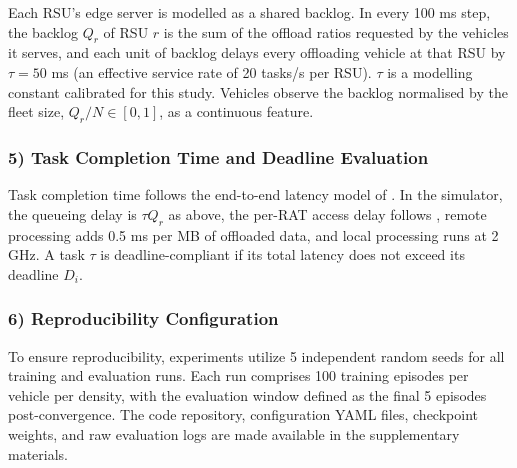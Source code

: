 Each RSU's edge server is modelled as a shared backlog. In every 100 ms step, the backlog $Q_r$ of RSU $r$ is the sum of the offload ratios requested by the vehicles it serves, and each unit of backlog delays every offloading vehicle at that RSU by $\tau = 50$ ms (an effective service rate of 20 tasks/s per RSU). $\tau$ is a modelling constant calibrated for this study. Vehicles observe the backlog normalised by the fleet size, $Q_r/N \in [0,1]$, as a continuous feature.

\subsubsection*{5) Task Completion Time and Deadline Evaluation}

Task completion time follows the end-to-end latency model of . In the simulator, the queueing delay is $\tau Q_r$ as above, the per-RAT access delay follows , remote processing adds 0.5 ms per MB of offloaded data, and local processing runs at 2 GHz. A task $\tau$ is deadline-compliant if its total latency does not exceed its deadline $D_i$.

\subsubsection*{6) Reproducibility Configuration}

To ensure reproducibility, experiments utilize 5 independent random seeds for all training and evaluation runs. Each run comprises 100 training episodes per vehicle per density, with the evaluation window defined as the final 5 episodes post-convergence. The code repository, configuration YAML files, checkpoint weights, and raw evaluation logs are made available in the supplementary materials.


